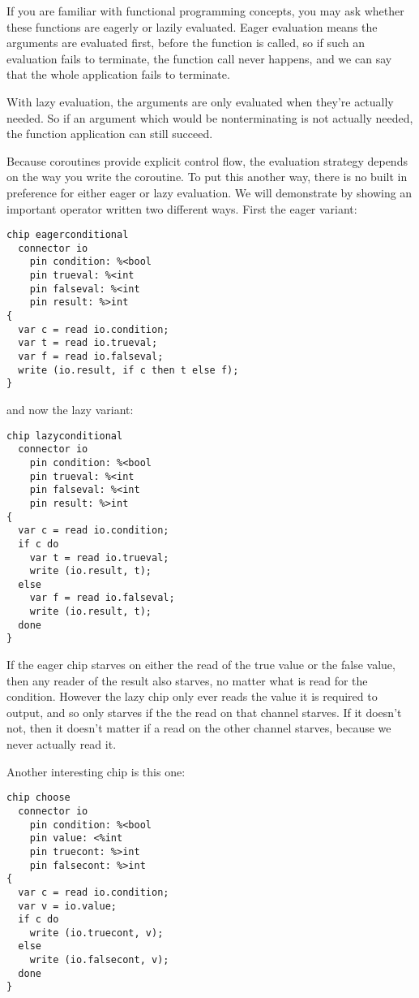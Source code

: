 \documentclass[oneside]{book}
\begin{document}
If you are familiar with functional programming concepts, you may
ask whether these functions are eagerly or lazily evaluated.
Eager evaluation means the arguments are evaluated first,
before the function is called, so if such an evaluation fails
to terminate, the function call never happens, and we can say that
the whole application fails to terminate.

With lazy evaluation, the arguments are only evaluated when they're
actually needed. So if an argument which would be nonterminating
is not actually needed, the function application can still succeed.

Because coroutines provide explicit control flow, the evaluation
strategy depends on the way you write the coroutine. To put this
another way, there is no built in preference for either eager or
lazy evaluation. We will demonstrate by showing an important
operator written two different ways. First the eager variant:

\begin{verbatim}
chip eagerconditional
  connector io
    pin condition: %<bool
    pin trueval: %<int
    pin falseval: %<int
    pin result: %>int
{
  var c = read io.condition;
  var t = read io.trueval;
  var f = read io.falseval;
  write (io.result, if c then t else f);
}
\end{verbatim}

and now the lazy variant:

\begin{verbatim}
chip lazyconditional
  connector io
    pin condition: %<bool
    pin trueval: %<int
    pin falseval: %<int
    pin result: %>int
{
  var c = read io.condition;
  if c do
    var t = read io.trueval;
    write (io.result, t);
  else 
    var f = read io.falseval;
    write (io.result, t);
  done
}
\end{verbatim}

If the eager chip starves on either the read of the true value
or the false value, then any reader of the result also starves,
no matter what is read for the condition. However the lazy
chip only ever reads the value it is required to output,
and so only starves if the the read on that channel starves.
If it doesn't not, then it doesn't matter if a read on the
other channel starves, because we never actually read it.

Another interesting chip is this one:

\begin{verbatim}
chip choose
  connector io
    pin condition: %<bool
    pin value: <%int
    pin truecont: %>int
    pin falsecont: %>int
{
  var c = read io.condition;
  var v = io.value;
  if c do
    write (io.truecont, v);
  else
    write (io.falsecont, v);
  done
}
\end{verbatim}
\end{document}
